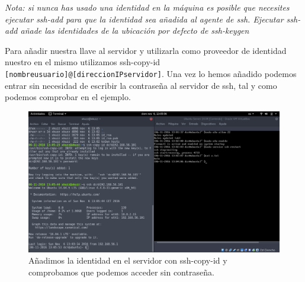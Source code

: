 \begin{flushleft}
\textit{Nota: si nunca has usado una identidad en la máquina es posible que necesites ejecutar ssh-add\cite{c6b} para que la identidad sea añadida al agente de ssh. Ejecutar ssh-add añade las identidades de la ubicación por defecto de ssh-keygen} \linebreak

Para añadir nuestra llave al servidor y utilizarla como proveedor de identidad nuestro en el mismo utilizamos ssh-copy-id\cite{c6c} \verb|[nombreusuario]@[direccionIPservidor]|.
Una vez lo hemos añadido podemos entrar sin necesidad de escribir la contraseña al servidor de ssh, tal y como podemos comprobar en el ejemplo.

\begin{figure}[H]
	\centering
	\includegraphics[scale=0.3]{ssh-copy-id.png}
	\caption{Añadimos la identidad en el servidor con ssh-copy-id y comprobamos que podemos acceder sin contraseña.}
\end{figure}


\end{flushleft}
